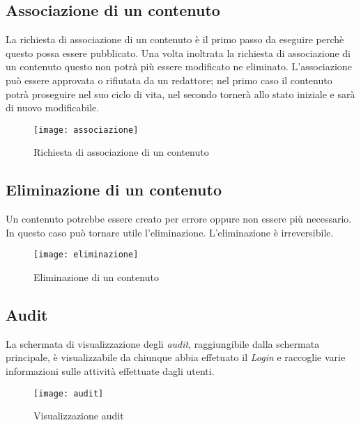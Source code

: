 \subsection{Associazione di un contenuto}
La richiesta di associazione di un contenuto è il primo passo da eseguire perchè questo possa essere pubblicato. Una volta inoltrata la richiesta di associazione di un contenuto questo non potrà più essere modificato ne eliminato. L'associazione può essere approvata o rifiutata da un redattore; nel primo caso il contenuto potrà proseguire nel suo ciclo di vita, nel secondo tornerà allo stato iniziale e sarà di nuovo modificabile.
\begin{figure}[h]
    \begin{center}
    \texttt{[image: associazione]}
    \caption{Richiesta di associazione di un contenuto}
    \label{fig:figure28}
    \end{center}
\end{figure}

\subsection{Eliminazione di un contenuto}
Un contenuto potrebbe essere creato per errore oppure non essere più necessario. In questo caso può tornare utile l'eliminazione. L'eliminazione è irreversibile.
\begin{figure}[h]
    \begin{center}
    \texttt{[image: eliminazione]}
    \caption{Eliminazione di un contenuto}
    \label{fig:figure29}
    \end{center}
\end{figure}

\subsection{Audit}
La schermata di visualizzazione degli \textit{audit}, raggiungibile dalla schermata principale, è visualizzabile da chiunque abbia effetuato il \textit{Login} e raccoglie varie informazioni sulle attività effettuate dagli utenti.
\begin{figure}[h]
    \begin{center}
    \texttt{[image: audit]}
    \caption{Visualizzazione audit}
    \label{fig:figure30}
    \end{center}
\end{figure}

